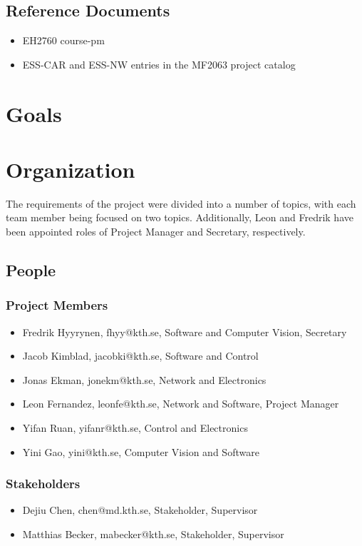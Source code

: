 \documentclass[11pt, titlepage]{article} %
\begin{document}
\subsection*{Reference Documents}
\begin{itemize}
    \item EH2760 course-pm \cite{eh2760_pm}
    \item ESS-CAR and ESS-NW entries in the MF2063 project catalog
        \cite{projects}
\end{itemize}

\section{Goals}
\section{Organization}
The requirements of the project were divided into a number of topics,
with each team member being focused on two topics. Additionally, Leon and
Fredrik have been appointed roles of Project Manager and Secretary,
respectively.
\subsection{People}
\subsubsection{Project Members}
\begin{itemize}
\item Fredrik Hyyrynen, fhyy@kth.se, Software and Computer Vision, Secretary
\item Jacob Kimblad, jacobki@kth.se, Software and Control
\item Jonas Ekman, jonekm@kth.se, Network and Electronics
\item Leon Fernandez, leonfe@kth.se, Network and Software, Project Manager
\item Yifan Ruan, yifanr@kth.se, Control and Electronics
\item Yini Gao, yini@kth.se, Computer Vision and Software
\end{itemize}

\subsubsection{Stakeholders}
\begin{itemize}
    \item Dejiu Chen, chen@md.kth.se, Stakeholder, Supervisor
    \item Matthias Becker, mabecker@kth.se, Stakeholder, Supervisor
\end{itemize}
\end{document}
